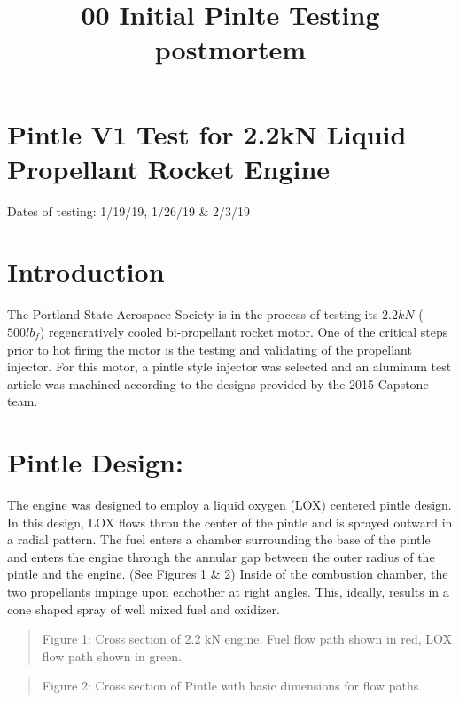 \documentclass[11pt]{article}
\title{00 Initial Pinlte Testing postmortem }
\begin{document}
    
    
    \maketitle
    
    

    
    \section{Pintle V1 Test for 2.2kN Liquid Propellant Rocket
Engine}\label{pintle-v1-test-for-2.2kn-liquid-propellant-rocket-engine}

Dates of testing: 1/19/19, 1/26/19 \& 2/3/19

    \section{Introduction}\label{introduction}

The Portland State Aerospace Society is in the process of testing its
\(2.2kN\) (\(500 lb_f\)) regeneratively cooled bi-propellant rocket
motor. One of the critical steps prior to hot firing the motor is the
testing and validating of the propellant injector. For this motor, a
pintle style injector was selected and an aluminum test article was
machined according to the designs provided by the 2015 Capstone team.

    \section{Pintle Design:}\label{pintle-design}

The engine was designed to employ a liquid oxygen (LOX) centered pintle
design. In this design, LOX flows throu the center of the pintle and is
sprayed outward in a radial pattern. The fuel enters a chamber
surrounding the base of the pintle and enters the engine through the
annular gap between the outer radius of the pintle and the engine. (See
Figures 1 \& 2) Inside of the combustion chamber, the two propellants
impinge upon eachother at right angles. This, ideally, results in a cone
shaped spray of well mixed fuel and oxidizer.

\begin{quote}
Figure 1: Cross section of 2.2 kN engine. Fuel flow path shown in red,
LOX flow path shown in green.
\end{quote}

\begin{quote}
Figure 2: Cross section of Pintle with basic dimensions for flow paths.
\end{quote}
\end{document}
